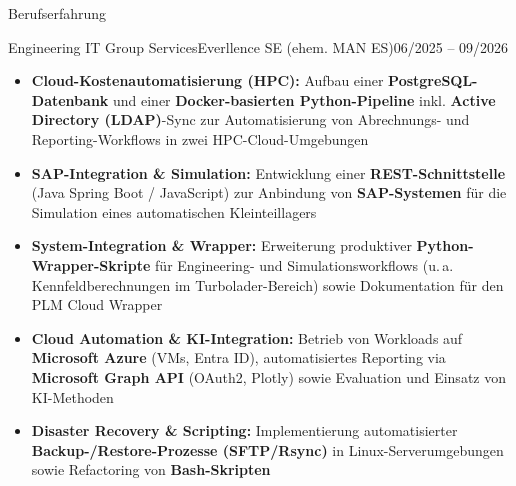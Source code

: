 \documentclass[]{mcdowellcv}
\begin{document}
    
    \makeheader
    
    
    \begin{cvsection}{Berufserfahrung}
        \begin{cvsubsection}{Engineering IT Group Services}{Everllence SE (ehem. MAN ES)}{06/2025 -- 09/2026} 
            \begin{itemize}
                \item \textbf{Cloud-Kostenautomatisierung (HPC):} Aufbau einer \textbf{PostgreSQL-Datenbank} und einer \textbf{Docker-basierten Python-Pipeline} inkl. \textbf{Active Directory (LDAP)}-Sync zur Automatisierung von Abrechnungs- und Reporting-Workflows in zwei HPC-Cloud-Umgebungen
                \item \textbf{SAP-Integration \& Simulation:} Entwicklung einer \textbf{REST-Schnittstelle} (Java Spring Boot / JavaScript) zur Anbindung von \textbf{SAP-Systemen} für die Simulation eines automatischen Kleinteillagers
                \item \textbf{System-Integration \& Wrapper:} Erweiterung produktiver \textbf{Python-Wrapper-Skripte} für Engineering- und Simulationsworkflows (u.\,a. Kennfeldberechnungen im Turbolader-Bereich) sowie Dokumentation für den PLM Cloud Wrapper
                \item \textbf{Cloud Automation \& KI-Integration:} Betrieb von Workloads auf \textbf{Microsoft Azure} (VMs, Entra ID), automatisiertes Reporting via \textbf{Microsoft Graph API} (OAuth2, Plotly) sowie Evaluation und Einsatz von KI-Methoden
                \item \textbf{Disaster Recovery \& Scripting:} Implementierung automatisierter \textbf{Backup-/Restore-Prozesse (SFTP/Rsync)} in Linux-Serverumgebungen sowie Refactoring von \textbf{Bash-Skripten}
            \end{itemize}
        \end{cvsubsection}
        
        \vspace{0.15cm}
        

\end{cvsection}
\end{document}
